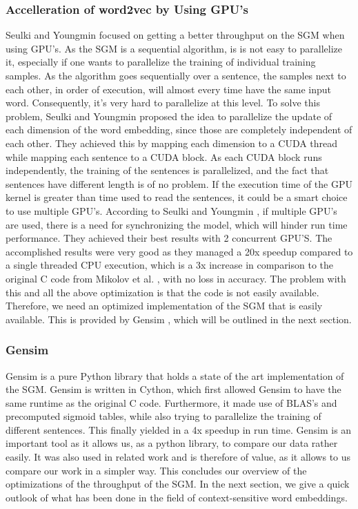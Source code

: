 \subsubsection{Accelleration of word2vec by Using GPU's}
Seulki and Youngmin \cite{gpu} focused on getting a better throughput on the SGM when using GPU's. As the SGM is a sequential algorithm, is is not easy to parallelize it, especially if one wants to parallelize the training of individual training samples. As the algorithm goes sequentially over a sentence, the samples next to each other, in order of execution, will almost every time have the same input word. Consequently, it's very hard to parallelize at this level. To solve this problem, Seulki and Youngmin \cite{gpu} proposed the idea to parallelize the update of each dimension of the word embedding, since those are completely independent of each other. They achieved this by mapping each dimension to a CUDA thread while mapping each sentence to a CUDA block. As each CUDA block runs independently, the training of the sentences is parallelized, and the fact that sentences have different length is of no problem. If the execution time of the GPU kernel is greater than time used to read the sentences, it could be a smart choice to use multiple GPU's. According to Seulki and Youngmin \cite{gpu}, if multiple GPU's are used, there is a need for synchronizing the model, which will hinder run time performance. They achieved their best results with 2 concurrent GPU'S. The accomplished results were very good as they managed a 20x speedup compared to a single threaded CPU execution, which is a 3x increase in comparison to the original C code from Mikolov et al. \cite{mikolov2}, with no loss in accuracy. The problem with this and all the above optimization is that the code is not easily available. Therefore, we need an optimized implementation of the SGM that is easily available. This is provided by Gensim \cite{gensim}, which will be outlined in the next section.
\subsubsection{Gensim}
Gensim \cite{gensim} is a pure Python library that holds a state of the art implementation of the SGM. Gensim is written in Cython, which first allowed Gensim to have the same runtime as the original C code. Furthermore, it made use of BLAS's and precomputed sigmoid tables, while also trying to parallelize the training of different sentences. This finally yielded in a 4x speedup in run time. Gensim is an important tool as it allows us, as a python library, to compare our data rather easily. It was also used in related work \cite{intel} and is therefore of value, as it allows to us compare our work in a simpler way. This concludes our overview of the optimizations of the throughput of the SGM. In the next section, we give a quick outlook of what has been done in the field of context-sensitive word embeddings.

